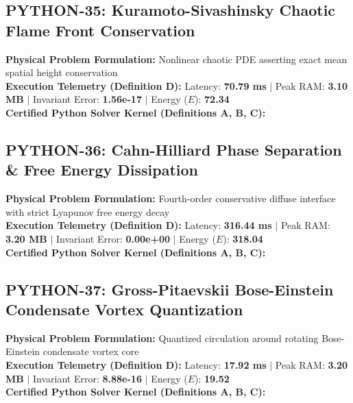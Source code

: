 \vspace{1em}
\subsection{PYTHON-35: Kuramoto-Sivashinsky Chaotic Flame Front Conservation}
\textbf{Physical Problem Formulation:} Nonlinear chaotic PDE asserting exact mean spatial height conservation\\
\textbf{Execution Telemetry (Definition D):} Latency: \textbf{70.79 ms} $|$ Peak RAM: \textbf{3.10 MB} $|$ Invariant Error: \textbf{1.56e-17} $|$ Energy ($E$): \textbf{72.34}\\

\textbf{Certified Python Solver Kernel (Definitions A, B, C):}


\vspace{1em}
\subsection{PYTHON-36: Cahn-Hilliard Phase Separation \& Free Energy Dissipation}
\textbf{Physical Problem Formulation:} Fourth-order conservative diffuse interface with strict Lyapunov free energy decay\\
\textbf{Execution Telemetry (Definition D):} Latency: \textbf{316.44 ms} $|$ Peak RAM: \textbf{3.20 MB} $|$ Invariant Error: \textbf{0.00e+00} $|$ Energy ($E$): \textbf{318.04}\\

\textbf{Certified Python Solver Kernel (Definitions A, B, C):}


\vspace{1em}
\subsection{PYTHON-37: Gross-Pitaevskii Bose-Einstein Condensate Vortex Quantization}
\textbf{Physical Problem Formulation:} Quantized circulation around rotating Bose-Einstein condensate vortex core\\
\textbf{Execution Telemetry (Definition D):} Latency: \textbf{17.92 ms} $|$ Peak RAM: \textbf{3.20 MB} $|$ Invariant Error: \textbf{8.88e-16} $|$ Energy ($E$): \textbf{19.52}\\

\textbf{Certified Python Solver Kernel (Definitions A, B, C):}


\vspace{1em}

